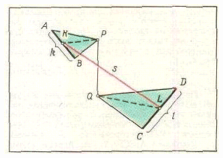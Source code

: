 \documentclass[12pt]{article}
\begin{document}
\begin{multicols}{2}
\setcounter{figure}{5}
\begin{figure}[H]
    \includegraphics[scale=0.5]{ris6.png}
    \captionsetup{singlelinecheck=off}
    \caption{}
    \label{fig:ris6}
\end{figure}


\end{multicols}
\end{document}
